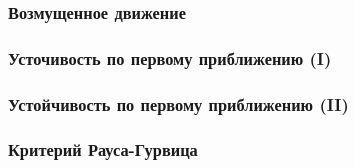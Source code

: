 
\subsubsection*{Возмущенное движение}


% 

% 
% 
% 

\subsubsection*{Усточивость по первому приближению (I)}


\subsubsection*{Устойчивость по первому приближению (II)}


\subsubsection*{Критерий Рауса-Гурвица}


% 
% 









